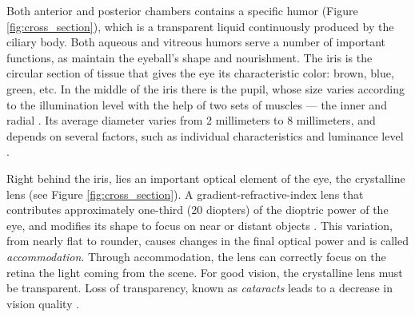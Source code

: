 Both anterior and posterior chambers contains a specific humor (Figure \ref{fig:cross_section}), which is a transparent liquid continuously produced by the ciliary body. Both aqueous and vitreous humors serve a number of important functions, as maintain the eyeball's shape and nourishment. The iris is the circular section of tissue that gives the eye its characteristic color: brown, blue, green, etc. In the middle of the iris there is 
the pupil, whose size varies according to the illumination level with the help of two sets of muscles --- the inner and radial \cite{Schwiegerling2004}. Its average diameter varies from 2 millimeters to 8 millimeters, and depends on several factors, such as individual characteristics and luminance level \cite{Yoder2011}.

Right behind the iris, lies an important optical element of the eye, the crystalline lens (see Figure \ref{fig:cross_section}). A gradient-refractive-index lens that contributes approximately one-third (20 diopters) of the dioptric power of the eye, and modifies its shape to focus on near or distant objects \cite{Schwiegerling2004}. This variation, from nearly flat to rounder, causes changes in the final optical power and is called {\it accommodation}. Through accommodation, the lens can correctly focus on the retina the light coming from the scene. For good vision, the crystalline lens must be transparent. %
Loss of transparency, known as {\it cataracts} leads to a decrease in vision quality
\cite{Schwartz2010}.